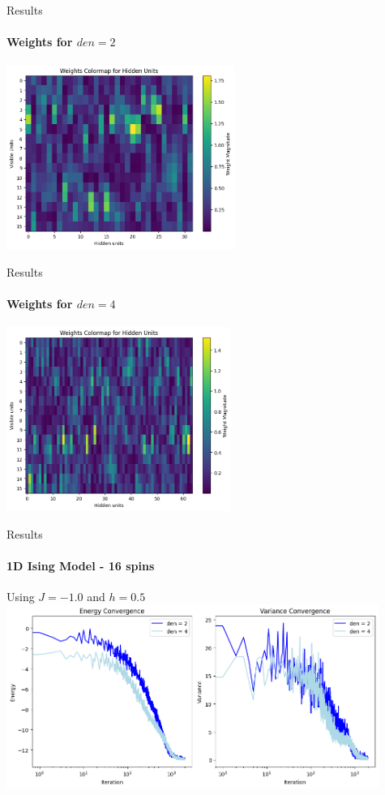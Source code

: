 \documentclass{beamer}
\begin{document}
\begin{frame}{Results}
\framesubtitle{Weights for $den = 2$}
\begin{center}
\includegraphics[height=6cm]{images/16spin_den2_j1.png}
\end{center}
\end{frame}

\begin{frame}{Results}
\framesubtitle{Weights for $den = 4$}
\begin{center}
\includegraphics[height=6cm]{images/16spin_den4_j1.png}
\end{center}
\end{frame}

\begin{frame}{Results}
\framesubtitle{1D Ising Model - 16 spins}
Using $J = -1.0$ and $h=0.5$
\includegraphics[height=6cm]{images/16spin_history_jm1.png}
\end{frame}
\end{document}
